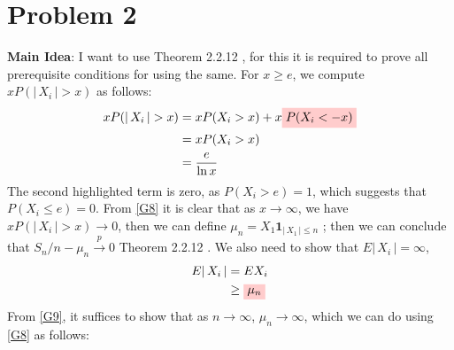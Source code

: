 \documentclass{article}
\newcommand{\highlight}[1]{%
  \colorbox{red!20}{$\displaystyle#1$}}
\newcommand{\abs}[1]{\vert \, #1 \, \vert}
\begin{document}
\section{Problem 2}
\textbf{Main Idea}: I want to use Theorem 2.2.12 \cite{10.5555/1869916}, for this it is required to prove all prerequisite conditions for using the same. For $x \geq e$, we compute $x P( \abs{X_i} > x)$ as follows: 
\begin{equation}
    \label{G8}
    \begin{split}
        xP( \abs{X_i} > x) &= xP(X_i > x) + x\highlight{P(X_i < -x)}\\
        &= xP(X_i > x)\\
        &= \frac{e}{\ln{x}}
    \end{split}
\end{equation}
The second highlighted term is zero, as $P(X_i > e) = 1$, which suggests that $P(X_i \leq e ) = 0$. From \ref{G8} it is clear that as $x \rightarrow \infty$, we have $xP( \abs{X_i} > x) \rightarrow 0$, then we can define $\mu_n = X_1\mathbf{1}_{\abs{X_1}\leq n}$ ; then we can conclude that $S_n/n - \mu_n \xrightarrow{p} 0$ Theorem 2.2.12 \cite{10.5555/1869916}. We also need to show that $E\abs{X_i} = \infty$, 
\begin{equation}
    \label{G9}
    \begin{split}
        E\abs{X_i} &= EX_i \\
        &\geq \highlight{\mu_n}
    \end{split}
\end{equation}
From \ref{G9}, it suffices to show that as $n \rightarrow \infty$, $\mu_n \rightarrow \infty$, which we can do using  \ref{G8} as follows: 
\printbibliography
\end{document}
